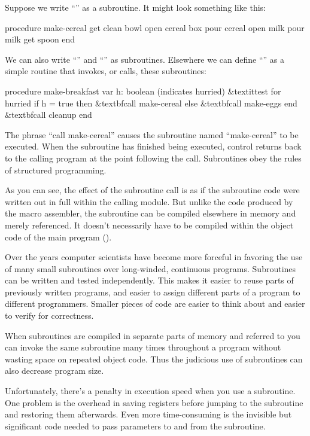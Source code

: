 Suppose we write ``'' as a subroutine. It might look
something like this:
\begin{Code}[fontfamily=cmss]
procedure make-cereal
   get clean bowl
   open cereal box
   pour cereal
   open milk
   pour milk
   get spoon
end
\end{Code}
We can also write ``'' and ``'' as
subroutines.  Elsewhere we can define ``'' as a
simple routine that invokes, or calls, these subroutines:

\begin{Code}[fontfamily=cmss,commandchars=\&\{\}]
procedure make-breakfast
   var h: boolean (indicates hurried)
   &textit{test for hurried}
   if h = true then
      &textbf{call make-cereal}
   else
      &textbf{call make-eggs}
   end
   &textbf{call cleanup}
end
\end{Code}
\label{make-breakfast}
\medskip
The phrase ``call make-cereal'' causes the subroutine named
``make-cereal'' to be executed. When the subroutine has finished being
executed, control returns back to the calling program at the point
following the call.  Subroutines obey the rules of structured
programming.

As you can see, the effect of the subroutine call is as if the
subroutine code were written out in full within the calling module.
But unlike the code produced by the macro assembler, the subroutine
can be compiled elsewhere in memory and merely referenced. It doesn't
necessarily have to be compiled within the object code of the main
program ().


Over the years computer scientists have become more forceful in
favoring the use of many small subroutines over long-winded,
continuous programs.  Subroutines can be written and tested
independently. This makes it easier to reuse parts of previously
written programs, and easier to assign different parts of a program to
different programmers. Smaller pieces of code are easier to think
about and easier to verify for correctness.

When subroutines are compiled in separate parts of memory and referred
to you can invoke the same subroutine many times throughout a program
without wasting space on repeated object code. Thus the judicious use
of subroutines can also decrease program size. 

Unfortunately, there's a penalty in execution speed when you use a
subroutine. One problem is the overhead in saving registers before
jumping to the subroutine and restoring them afterwards. Even more
time-consuming is the invisible but significant code needed to pass
parameters to and from the subroutine.


